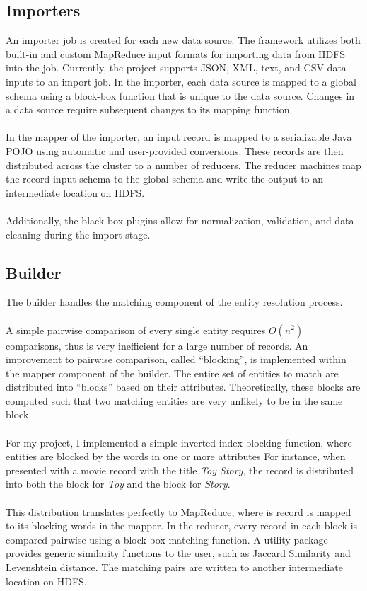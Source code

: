 \documentclass[12pt]{article}
\begin{document}
\subsection{Importers}
An importer job is created for each new data source. The framework utilizes both built-in and custom MapReduce input formats for importing data from HDFS into the job. Currently, the project supports JSON, XML, text, and CSV data inputs to an import job. In the importer, each data source is mapped to a global schema using a block-box function that is unique to the data source. Changes in a data source require subsequent changes to its mapping function.\\\\
In the mapper of the importer, an input record is mapped to a serializable Java POJO using automatic and user-provided conversions. These records are then distributed across the cluster to a number of reducers. The reducer machines map the record input schema to the global schema and write the output to an intermediate location on HDFS.\\\\
Additionally, the black-box plugins allow for normalization, validation, and data cleaning during the import stage.
\subsection{Builder}
The builder handles the matching component of the entity resolution process.\\\\
A simple pairwise comparison of every single entity requires $O(n^2)$ comparisons, thus is very inefficient for a large number of records. 
An improvement to pairwise comparison, called ``blocking'', is implemented within the mapper component of the builder.
The entire set of entities to match are distributed into ``blocks'' based on their attributes.
Theoretically, these blocks are computed such that two matching entities are very unlikely to be in the same block.\\\\
For my project, I implemented a simple inverted index blocking function, where entities are blocked by the words in one or more attributes
For instance, when presented with a movie record with the title \textit{Toy Story}, the record is distributed into both the block for \textit{Toy} and the block for \textit{Story}.\\\\
This distribution translates perfectly to MapReduce, where is record is mapped to its blocking words in the mapper. 
In the reducer, every record in each block is compared pairwise using a block-box matching function. 
A utility package provides generic similarity functions to the user, such as Jaccard Similarity and Levenshtein distance. 
The matching pairs are written to another intermediate location on HDFS.
\end{document}
